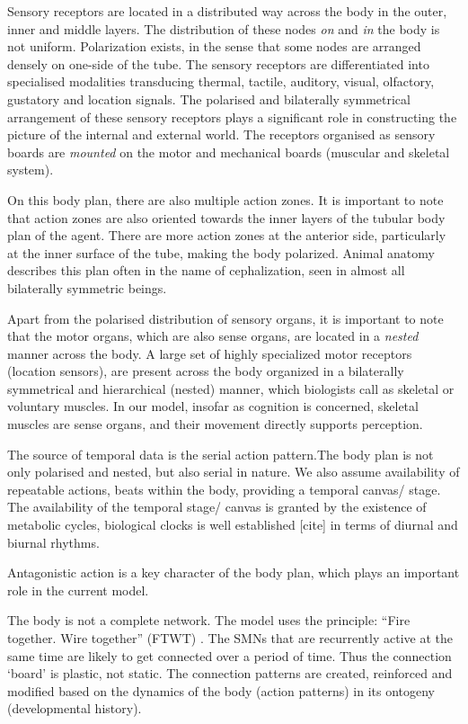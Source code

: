 Sensory receptors are located in a distributed way across the body in the outer, inner and middle layers. The distribution of these nodes \textit{on} and \textit{in} the body is not uniform. Polarization exists, in the sense that some nodes are arranged densely on one-side of the tube. The sensory receptors are differentiated into specialised modalities transducing thermal, tactile, auditory, visual, olfactory, gustatory and location signals. The polarised and bilaterally symmetrical arrangement of these sensory receptors plays a significant role in constructing the picture of the internal and external world. The receptors organised as sensory boards are \textit{mounted} on the motor and mechanical boards (muscular and skeletal system). 

On this body plan, there are also multiple action zones. It is important to note that action zones are also oriented towards the inner layers of the tubular body plan of the agent. There are more action zones at the anterior side, particularly at the inner surface of the tube, making the body polarized. Animal anatomy describes this plan often in the name of cephalization, seen in almost all bilaterally symmetric beings. 

Apart from the polarised distribution of sensory organs, it is important to note that the motor organs, which are also sense organs, are located in a \textit{nested} manner across the body.
A large set of highly specialized motor receptors (location sensors), are present across the body organized in a bilaterally symmetrical and hierarchical (nested) manner, which biologists call as skeletal or voluntary muscles. In our model, insofar as cognition is concerned, skeletal muscles are sense organs, and their movement directly supports perception.  

The source of temporal data is the serial action pattern.The body plan is not only polarised and nested, but also serial in nature. We also assume availability of repeatable actions, beats within the body, providing a temporal canvas/ stage. The availability of the temporal stage/ canvas is granted by the existence of metabolic cycles, biological clocks is well established [cite] in terms of diurnal and biurnal rhythms.

Antagonistic action is a key character of the body plan, which plays an important role in the current model. 

The body is not a complete network. The model uses the principle: ``Fire together. Wire together'' (FTWT) \cite{hebb1949organisation}. The SMNs that are recurrently active at the same time are likely to get connected over a period of time. Thus the connection `board' is plastic, not static. The connection patterns are created, reinforced and modified based on the dynamics of the body (action patterns) in its ontogeny (developmental history). 

